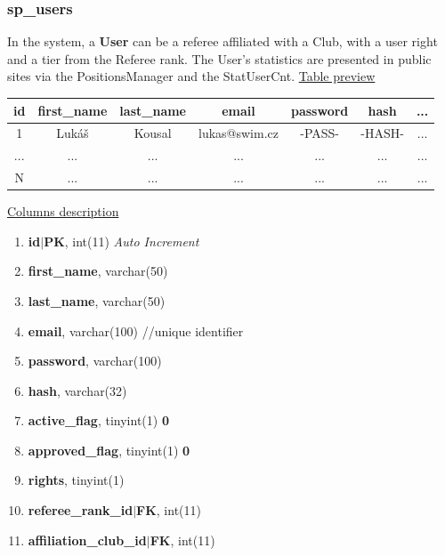 \subsubsection*{sp\_users}
In the system, a \textbf{User} can be a referee affiliated with a Club, with a user right and a tier from the Referee rank. The User's statistics are presented in public sites via the PositionsManager and the StatUserCnt.
\newline
\underline{Table preview}
\begin{center}
  \begin{tabular}{||c c c c c c c||} 
  \hline
  id & first\_name & last\_name & email & password & hash & ... \\ [0.5ex] 
  \hline\hline
  1 & Lukáš & Kousal & lukas@swim.cz & -PASS- & -HASH- & ... \\ 
  \hline
  ... & ... & ... & ... & ... & ... & ... \\
  \hline
  N & ... & ... & ... & ... & ... & ... \\ 
  \hline
 \end{tabular}
 \end{center}
 \underline{Columns description}
 \begin{enumerate}
   \setlength\itemsep{0em}
   \item \textbf{id$|$PK}, int(11) \textit{Auto Increment}
   \item \textbf{first\_name}, varchar(50)
   \item \textbf{last\_name}, varchar(50)
   \item \textbf{email}, varchar(100) //unique identifier
   \item \textbf{password}, varchar(100)
   \item \textbf{hash}, varchar(32)
   \item \textbf{active\_flag}, tinyint(1) \lbrack \textbf{0}\rbrack 
   \item \textbf{approved\_flag}, tinyint(1) \lbrack \textbf{0}\rbrack 
   \item \textbf{rights}, tinyint(1)
   \item \textbf{referee\_rank\_id$|$FK}, int(11)
   \item \textbf{affiliation\_club\_id$|$FK}, int(11)
\end{enumerate}

